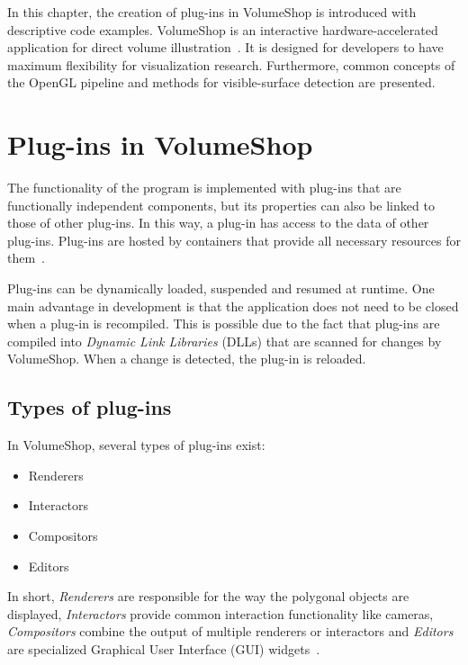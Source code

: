 
In this chapter, the creation of plug-ins in VolumeShop is introduced with descriptive code examples. VolumeShop is an interactive hardware-accelerated application for direct volume illustration~\cite{proc:volumeshop}. It is designed for developers to have maximum flexibility for visualization research. Furthermore, common concepts of the OpenGL pipeline and methods for visible-surface detection are presented. 

\section{Plug-ins in VolumeShop}
The functionality of the program is implemented with plug-ins that are functionally independent components, but its properties can also be linked to those of other plug-ins. In this way, a plug-in has access to the data of other plug-ins. Plug-ins are hosted by containers that provide all necessary resources for them~\cite{misc:volumeshop101}.

Plug-ins can be dynamically loaded, suspended and resumed at runtime. One main advantage in development is that the application does not need to be closed when a plug-in is recompiled. This is possible due to the fact that plug-ins are compiled into \emph{Dynamic Link Libraries} (DLLs) that are scanned for changes by VolumeShop. When a change is detected, the plug-in is reloaded.

\subsection{Types of plug-ins}
In VolumeShop, several types of plug-ins exist:
\begin{itemize}
	\item Renderers
	\item Interactors
	\item Compositors
	\item Editors
\end{itemize}

In short, \emph{Renderers} are responsible for the way the polygonal objects are displayed, \emph{Interactors} provide common interaction functionality like cameras, \emph{Compositors} combine the output of multiple renderers or interactors and \emph{Editors} are specialized Graphical User Interface (GUI) widgets~\cite{misc:volumeshop101}.


